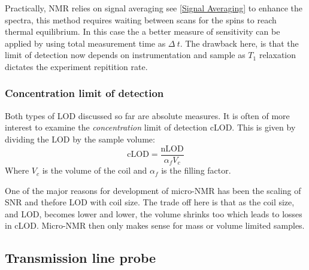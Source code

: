 Practically, NMR relies on signal averaging see \ref{Signal Averaging} to enhance the spectra, this
method requires waiting between scans for the spins to reach thermal equilibrium. In
this case the a better measure of sensitivity can be applied by using total measurement time
as $\Delta~t$. The drawback here, is that the limit of detection now depends on instrumentation
and sample as $T_1$ relaxation dictates the experiment repitition rate.

\subsubsection{Concentration limit of detection}

Both types of LOD discussed so far are absolute measures. It is often of more
interest to examine the \textit{concentration} limit of detection cLOD. This is given by
dividing the LOD by the sample volume:
\begin{equation}
  \text{cLOD} = \frac{\text{nLOD}}{\alpha_fV_c}
\end{equation}
Where $V_c$ is the volume of the coil and $\alpha_f$ is the filling factor.

One of the major reasons for development of micro-NMR has been the scaling of SNR and thefore LOD
with coil size. The trade off here is that as the coil size, and LOD, becomes lower and lower, the
volume shrinks too which leads to losses in cLOD. Micro-NMR then only makes sense for mass
or volume limited samples.

\subsection{Transmission line probe}

